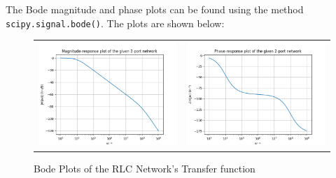 \documentclass[11pt, a4paper]{article}
\begin{document}
    The Bode magnitude and phase plots can be found using the method \texttt{scipy.signal.bode()}. The plots are shown below:
    \begin{figure}[H]
        \centering
        \setlength\tabcolsep{2pt}
        \begin{tabular}{cc}
            \includegraphics[scale=0.5]{Figure_5.png} &
            \includegraphics[scale=0.5]{Figure_6.png}\\
        \end{tabular}
        \caption{Bode Plots of the RLC Network's Transfer function}
    \end{figure}
\end{document}
